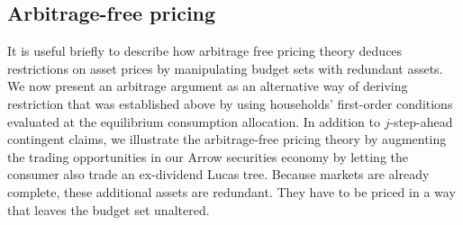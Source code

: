 \subsection{Arbitrage-free pricing}
It is useful briefly to describe how arbitrage free pricing theory
%
 deduces restrictions on asset
prices by manipulating  budget sets with redundant
assets.
We now present an
arbitrage argument as an alternative way of deriving restriction
 that was established above by using households'
first-order conditions evaluated at the equilibrium consumption
allocation. In addition to $j$-step-ahead contingent claims, we
illustrate the arbitrage-free pricing theory by augmenting the trading
opportunities in our Arrow securities economy by letting the
consumer also trade  an ex-dividend Lucas tree. Because markets
are already complete, these additional assets are redundant. They
have to be priced in a way that leaves the budget set
unaltered.


